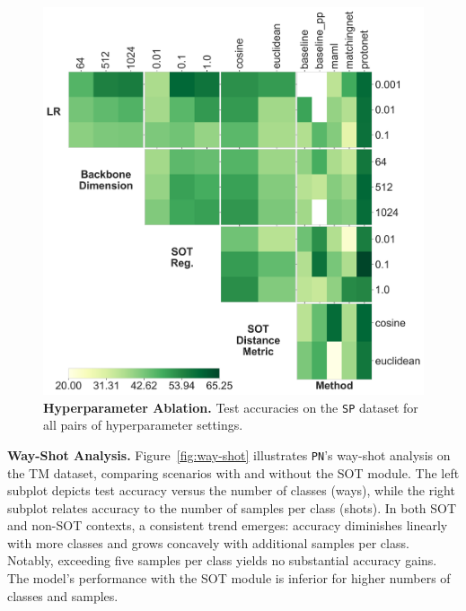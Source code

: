 \begin{figure}[h!]
    \centering
    \includegraphics[width=1\columnwidth]{figures/hparams-interaction.png}
    \caption{\textbf{Hyperparameter Ablation.} Test accuracies on the \texttt{SP} dataset for all pairs of hyperparameter settings.}
    \label{fig:hparams-swissprot-grid}
\end{figure}



\textbf{Way-Shot Analysis.} Figure~\ref{fig:way-shot} illustrates \texttt{PN}'s way-shot analysis on the TM dataset, comparing scenarios with and without the SOT module. The left subplot depicts test accuracy versus the number of classes (ways), while the right subplot relates accuracy to the number of samples per class (shots). In both SOT and non-SOT contexts, a consistent trend emerges: accuracy diminishes linearly with more classes and grows concavely with additional samples per class. Notably, exceeding five samples per class yields no substantial accuracy gains. The model's performance with the SOT module is inferior for higher numbers of classes and samples.

